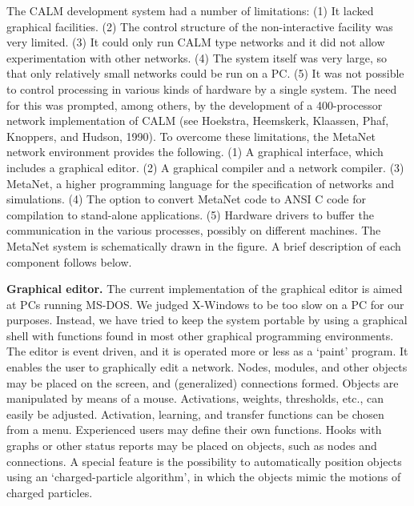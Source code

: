 \documentclass[11pt, a4paper]{article}
\begin{document}
The CALM development system had a number of limitations: (1) It lacked graphical facilities. (2) The control structure of the non-interactive facility was very limited. (3) It could only run CALM type networks and it did not allow experimentation with other networks. (4) The system itself was very large, so that only relatively small networks could be run on a PC. (5) It was not possible to control processing in various kinds of hardware by a single system. The need for this was prompted, among others, by the development of a 400-processor network implementation of CALM (see Hoekstra, Heemskerk, Klaassen, Phaf, Knoppers, and Hudson, 1990). To overcome these limitations, the MetaNet network environment provides the following. (1) A graphical interface, which includes a graphical editor. (2) A graphical compiler and a network compiler. (3) MetaNet, a higher programming language for the specification of networks and simulations. (4) The option to convert MetaNet code to ANSI C code for compilation to stand-alone applications. (5) Hardware drivers to buffer the communication in the various processes, possibly on different machines. The MetaNet system is schematically drawn in the figure. A brief description of each component follows below.

\textbf{Graphical editor.} The current implementation of the graphical editor is aimed at PCs running MS-DOS. We judged X-Windows to be too slow on a PC for our purposes. Instead, we have tried to keep the system portable by using a graphical shell with functions found in most other graphical programming environments. The editor is event driven, and it is operated more or less as a `paint' program. It enables the user to graphically edit a network. Nodes, modules, and other objects may be placed on the screen, and (generalized) connections formed. Objects are manipulated by means of a mouse. Activations, weights, thresholds, etc., can easily be adjusted. Activation, learning, and transfer functions can be chosen from a menu. Experienced users may define their own functions. Hooks with graphs or other status reports may be placed on objects, such as nodes and connections. A special feature is the possibility to automatically position objects using an `charged-particle algorithm', in which the objects mimic the motions of charged particles.
\end{document}
